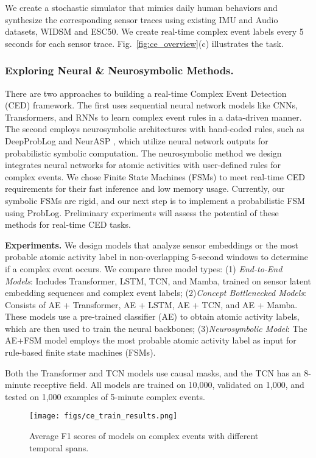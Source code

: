 We create a stochastic simulator that mimics daily human behaviors and synthesize the corresponding sensor traces using existing IMU and Audio datasets, WIDSM\cite{wisdm} and ESC50\cite{esc50}. We create real-time complex event labels every 5 seconds for each sensor trace. Fig.~\ref{fig:ce_overview}(c) illustrates the task.

\subsubsection{ Exploring Neural \& Neurosymbolic Methods.}
There are two approaches to building a real-time Complex Event Detection (CED) framework. The first uses sequential neural network models like CNNs, Transformers, and RNNs to learn complex event rules in a data-driven manner. The second employs neurosymbolic architectures with hand-coded rules, such as DeepProbLog\cite{deepproblog} and NeurASP \cite{neurasp}, which utilize neural network outputs for probabilistic symbolic computation. The neurosymbolic method we design integrates neural networks for atomic activities with user-defined rules for complex events. We chose Finite State Machines (FSMs) to meet real-time CED requirements for their fast inference and low memory usage. Currently, our symbolic FSMs are rigid, and our next step is to implement a probabilistic FSM using ProbLog. Preliminary experiments will assess the potential of these methods for real-time CED tasks.

\textbf{Experiments.} We design models that analyze sensor embeddings or the most probable atomic activity label in non-overlapping 5-second windows to determine if a complex event occurs. We compare three model types: (1) \textit{End-to-End Models}: Includes Transformer, LSTM, TCN, and Mamba, trained on sensor latent embedding sequences and complex event labels; (2)\textit{Concept Bottlenecked Models}: Consists of AE + Transformer, AE + LSTM, AE + TCN, and AE + Mamba. These models use a pre-trained classifier (AE) to obtain atomic activity labels, which are then used to train the neural backbones; (3)\textit{Neurosymbolic Model}: The AE+FSM model employs the most probable atomic activity label as input for rule-based finite state machines (FSMs).

Both the Transformer and TCN models use causal masks, and the TCN has an 8-minute receptive field. All models are trained on 10,000, validated on 1,000, and tested on 1,000 examples of 5-minute complex events.
\begin{figure}[t]
    \centering
\texttt{[image: figs/ce\_train\_results.png]}
    \caption{Average F1 scores of models on complex events with different temporal spans.}
    \label{fig:ce_train_results}
\end{figure}

